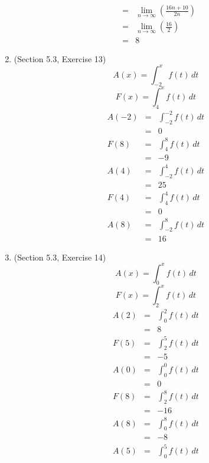 \documentclass{article}
\begin{document}
\begin{enumerate}
\begin{eqnarray}
                                                                                                                        &=& \lim_{n \to \infty}{\left(\frac{16n + 10}{2n}\right)} \\
                                                                                                                        &=& \lim_{n \to \infty}{\left(\frac{16}{2}\right)} \\
                                                                                                                        &=& 8
        \end{eqnarray}
    \item (Section 5.3, Exercise 13)
        $$A(x) = \int_{-2}^x{f(t)\,dt}$$
        $$F(x) = \int_4^x{f(t)\,dt}$$
        \begin{eqnarray}
            A(-2) &=& \int_{-2}^{-2}{f(t)\,dt} \\
                  &=& 0 \\
            F(8) &=& \int_4^8{f(t)\,dt} \\
                 &=& -9 \\
            A(4) &=& \int_{-2}^4{f(t)\,dt} \\
                 &=& 25 \\
            F(4) &=& \int_4^4{f(t)\,dt} \\
                 &=& 0 \\
            A(8) &=& \int_{-2}^8{f(t)\,dt} \\
                 &=& 16
        \end{eqnarray}
    \item (Section 5.3, Exercise 14)
        $$A(x) = \int_0^x{f(t)\,dt}$$
        $$F(x) = \int_2^x{f(t)\,dt}$$
        \begin{eqnarray}
            A(2) &=& \int_0^2{f(t)\,dt} \\
                 &=& 8 \\
            F(5) &=& \int_2^5{f(t)\,dt} \\
                 &=& -5 \\
            A(0) &=& \int_0^0{f(t)\,dt} \\
                 &=& 0 \\
            F(8) &=& \int_2^8{f(t)\,dt} \\
                 &=& -16 \\
            A(8) &=& \int_0^8{f(t)\,dt} \\
                 &=& -8 \\
            A(5) &=& \int_0^5{f(t)\,dt} \\

\end{eqnarray}
\end{enumerate}
\end{document}
